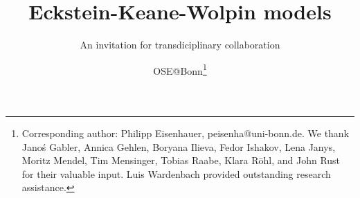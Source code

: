 
\title{Eckstein-Keane-Wolpin models}
\subtitle{An invitation for transdiciplinary collaboration}
\author{OSE@Bonn\thanks{Corresponding author: Philipp Eisenhauer, peisenha@uni-bonn.de. We thank  Jano\'s Gabler, Annica Gehlen, Boryana Ilieva, Fedor Ishakov, Lena Janys, Moritz Mendel, Tim Mensinger, Tobias Raabe, Klara R\"ohl, and John Rust for their valuable input. Luis Wardenbach provided outstanding research assistance.}}
\date{}
